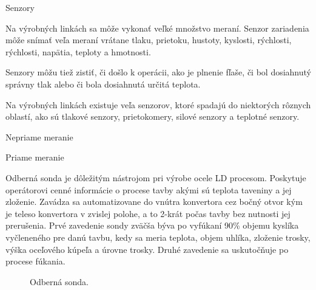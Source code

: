 \documentclass[]{tukediphc}
\begin{document}
Senzory

Na výrobných linkách sa môže vykonať veľké množstvo meraní. Senzor zariadenia môže snímať veľa meraní vrátane tlaku, prietoku, hustoty, kyslosti, rýchlosti, rýchlosti, napätia, teploty a hmotnosti.

Senzory môžu tiež zistiť, či došlo k operácii, ako je plnenie fľaše, či bol dosiahnutý správny tlak alebo či bola dosiahnutá určitá teplota.

Na výrobných linkách existuje veľa senzorov, ktoré spadajú do niektorých rôznych oblastí, ako sú tlakové senzory, prietokomery, silové senzory a teplotné senzory.

Nepriame meranie

Priame meranie

Odberná sonda je dôležitým nástrojom pri výrobe ocele LD procesom. Poskytuje operátorovi cenné informácie o procese tavby akými sú teplota taveniny a jej zloženie. Zavádza sa automatizovane do vnútra konvertora cez bočný otvor kým je teleso konvertora v zvislej polohe, a to 2-krát počas tavby bez nutnosti jej prerušenia. Prvé zavedenie sondy zväčša býva po vyfúkaní 90\% objemu kyslíka vyčleneného pre danú tavbu, kedy sa meria teplota, objem uhlíka, zloženie trosky, výška oceľového kúpeľa a úrovne trosky. Druhé zavedenie sa uskutočňuje po procese fúkania.

\begin{figure}[!ht]
	\centering
	\qquad
	\caption{Odberná sonda.}
\end{figure}
\end{document}
